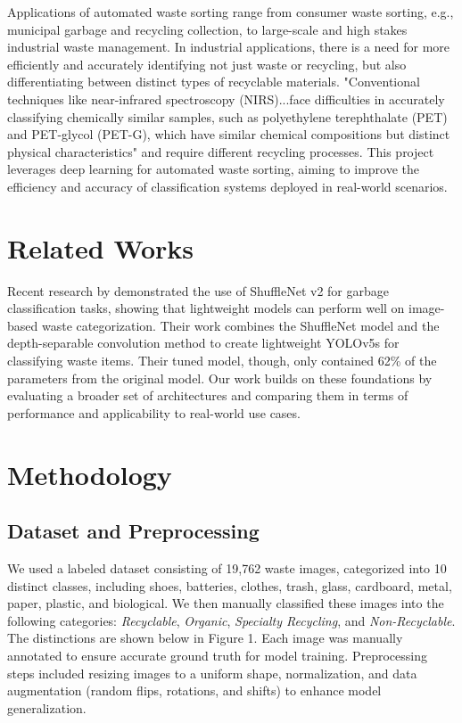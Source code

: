 \documentclass[11pt,twocolumn]{article}
\begin{document}
Applications of automated waste sorting range from consumer waste sorting, e.g., municipal garbage and recycling collection, to large-scale and high stakes industrial waste management. In industrial applications, there is a need for more efficiently and accurately identifying not just waste or recycling, but also differentiating between distinct types of recyclable materials. "Conventional techniques like near-infrared spectroscopy (NIRS)...face difficulties in accurately classifying chemically similar samples, such as polyethylene terephthalate (PET) and PET-glycol (PET-G), which have similar chemical compositions but distinct physical characteristics" \cite{choi2023} and require different recycling processes.
This project leverages deep learning for automated waste sorting, aiming to improve the efficiency and accuracy of classification systems deployed in real-world scenarios.

\section{Related Works}
\label{sec:background}
Recent research by \cite{chen2023} demonstrated the use of ShuffleNet v2 for garbage classification tasks, showing that lightweight models can perform well on image-based waste categorization. Their work combines the ShuffleNet model and the depth-separable convolution method to create lightweight YOLOv5s for classifying waste items. Their tuned model, though, only contained 62\% of the parameters from the original model. Our work builds on these foundations by evaluating a broader set of architectures and comparing them in terms of performance and applicability to real-world use cases.


\section{Methodology}
\label{sec:methodology}

\subsection{Dataset and Preprocessing}
We used a labeled dataset consisting of 19,762 waste images, categorized into 10 distinct classes, including shoes, batteries, clothes, trash, glass, cardboard, metal, paper, plastic, and biological. We then manually classified these images into the following categories: \textit{Recyclable}, \textit{Organic}, \textit{Specialty Recycling}, and \textit{Non-Recyclable}. The distinctions are shown below in Figure 1. Each image was manually annotated to ensure accurate ground truth for model training. Preprocessing steps included resizing images to a uniform shape, normalization, and data augmentation (random flips, rotations, and shifts) to enhance model generalization.
\end{document}
